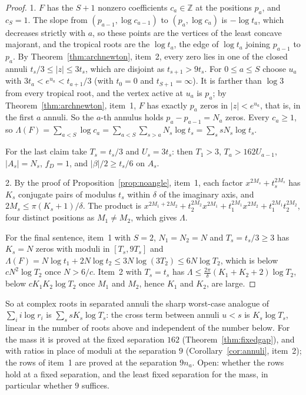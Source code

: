 \documentclass[11pt]{article}
\begin{document}
\begin{proof}
1.  $F$ has the $S+1$ nonzero coefficients $c_a\in\mathbb Z$ at the positions
$p_a$, and $c_S=1$.  The slope from $(p_{a-1},\log c_{a-1})$ to
$(p_a,\log c_a)$ is $-\log t_a$, which decreases strictly with $a$, so these
points are the vertices of the least concave majorant, and the tropical roots
are the $\log t_a$, the edge of $\log t_a$ joining $p_{a-1}$ to $p_a$.  By
Theorem~\ref{thm:archnewton}, item~2, every zero lies in one of the closed
annuli $t_s/3\le|z|\le3t_s$, which are disjoint as $t_{s+1}>9t_s$.  For $0\le a\le S$
choose $u_a$ with $3t_a<e^{u_a}<t_{a+1}/3$ (with $t_0=0$ and $t_{S+1}=\infty$).
It is farther than $\log3$ from every tropical root, and the vertex active at
$u_a$ is $p_a$; by Theorem~\ref{thm:archnewton}, item~1, $F$ has exactly
$p_a$ zeros in $|z|<e^{u_a}$, that is, in the first $a$ annuli.  So the
$a$-th annulus holds $p_a-p_{a-1}=N_a$ zeros.  Every $c_a\ge1$, so
$\Lambda(F)=\sum_{a<S}\log c_a=\sum_{a<S}\sum_{s>a}N_s\log t_s
=\sum_ssN_s\log t_s$.

For the last claim take $T_s=t_s/3$ and $U_s=3t_s$: then $T_1>3$,
$T_a>162U_{a-1}$, $|A_s|=N_s$, $f_D=1$, and $|\beta|/2\ge t_s/6$ on $A_s$.

2.  By the proof of Proposition~\ref{prop:noangle}, item~1, each factor
$x^{2M_s}+t_s^{2M_s}$ has $K_s$ conjugate pairs of modulus $t_s$ within
$\delta$ of the imaginary axis, and $2M_s\le\pi(K_s+1)/\delta$.  The product
is $x^{2M_1+2M_2}+t_2^{2M_2}x^{2M_1}+t_1^{2M_1}x^{2M_2}+t_1^{2M_1}t_2^{2M_2}$,
four distinct positions as $M_1\ne M_2$, which gives $\Lambda$.

For the final sentence, item~1 with $S=2$, $N_1=N_2=N$ and $T_s=t_s/3\ge3$
has $K_s=N$ zeros with moduli in $[T_s,9T_s]$ and
$\Lambda(F)=N\log t_1+2N\log t_2\le3N\log(3T_2)\le6N\log T_2$, which is below
$cN^2\log T_2$ once $N>6/c$.  Item~2 with $T_s=t_s$ has
$\Lambda\le\frac{2\pi}\delta(K_1+K_2+2)\log T_2$, below $cK_1K_2\log T_2$
once $M_1$ and $M_2$, hence $K_1$ and $K_2$, are large.
\end{proof}

So at complex roots in separated annuli the sharp worst-case analogue of
$\sum_ii\log r_i$ is $\sum_ssK_s\log T_s$: the cross term between annuli $u<s$ is $K_s\log T_s$,
linear in the number of roots above and independent of the number below.  For
the mass it is proved at the fixed separation $162$
(Theorem~\ref{thm:fixedgap}), and with ratios in place of moduli at the
separation $9$ (Corollary~\ref{cor:annuli}, item~2); the rows of item~1 are
proved at the separation $9n_a$.  Open: whether the rows hold
at a fixed separation, and the least fixed separation for the mass, in
particular whether $9$ suffices.
\end{document}
